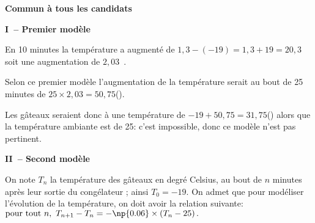 
\textbf{Commun à tous les candidats}

%
%

\begin{center}
\textbf{I~-- Premier modèle}
\end{center}

%
 
En 10 minutes la température a augmenté de $1,3 - ( - 19) = 1,3 + 19 = 20,3$ soit une augmentation de $2,03$~\textcelsius.

Selon ce premier modèle l'augmentation de la  température serait au bout de 25 minutes de $25 \times 2,03 = 50,75$(\textcelsius).

Les gâteaux seraient donc à une température de $- 19 + 50,75 = 31,75$(\textcelsius) alors que la température ambiante est de 25\textcelsius : c'est impossible, donc ce modèle n'est pas pertinent.

\begin{center}
\textbf{II~-- Second modèle}
\end{center}

On note $T_n$ la température des gâteaux  en degré Celsius, au bout de $n$ minutes après leur sortie du congélateur ; ainsi $T_0= - 19$.
  On admet que pour modéliser l'évolution de la température, on doit avoir la relation suivante:
 $\text{pour tout } n,\ T_{n+1}-T_n=-\np{0.06}\times \left(T_n - 25\right).$

